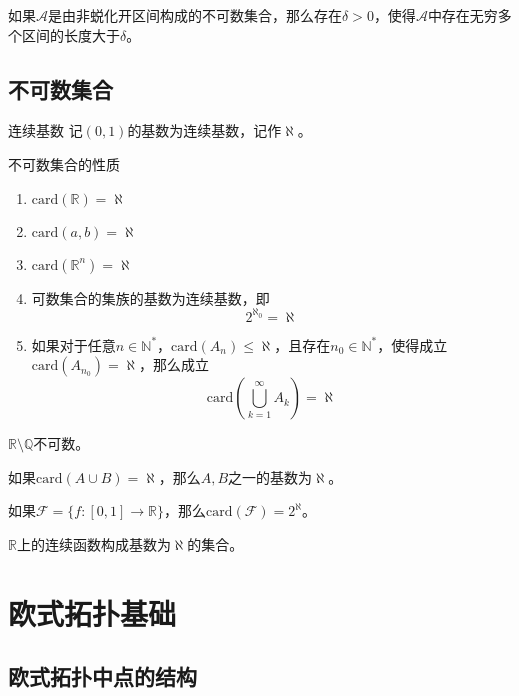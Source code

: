 \documentclass[lang = cn, scheme = chinese, thmcnt = section]{elegantbook}
\newcommand{\N}{\mathbb{N}}            %
\newcommand{\R}{\mathbb{R}}            %
\newcommand{\Q}{\mathbb{Q}}            %
\newcommand{\card}{\mathrm{card}}
\begin{document}
\begin{exercise}
	如果$\mathscr{A}$是由非蜕化开区间构成的不可数集合，那么存在$\delta>0$，使得$\mathscr{A}$中存在无穷多个区间的长度大于$\delta$。
\end{exercise}

\section{不可数集合}

\begin{definition}{连续基数}
	记$(0,1)$的基数为连续基数，记作$\aleph$。
\end{definition}

\begin{theorem}{不可数集合的性质}
	\begin{enumerate}
		\item $\card(\R)=\aleph$
		\item $\card(a,b)=\aleph$
		\item $\card(\R^n)=\aleph$
		\item 可数集合的集族的基数为连续基数，即
		$$
		2^{\aleph_0}=\aleph
		$$
		\item 如果对于任意$n\in\N^*$，$\card(A_n)\le\aleph$，且存在$n_0\in\N^*$，使得成立$\card(A_{n_0})=\aleph$，那么成立
		$$
		\card\left(\bigcup_{k=1}^{\infty}{A_k}\right)=\aleph
		$$
	\end{enumerate}
\end{theorem}

\begin{exercise}
	$\R\setminus\Q$不可数。
\end{exercise}

\begin{exercise}
	如果$\mathrm{card}(A\cup B)=\aleph$，那么$A,B$之一的基数为$\aleph$。
\end{exercise}

\begin{exercise}
	如果$\mathscr{F}=\{ f:[0,1]\to\R \}$，那么$\mathrm{card}(\mathscr{F})=2^\aleph$。
\end{exercise}

\begin{exercise}
	$\R$上的连续函数构成基数为$\aleph$的集合。
\end{exercise}

\chapter{欧式拓扑基础}

\section{欧式拓扑中点的结构}
\end{document}

